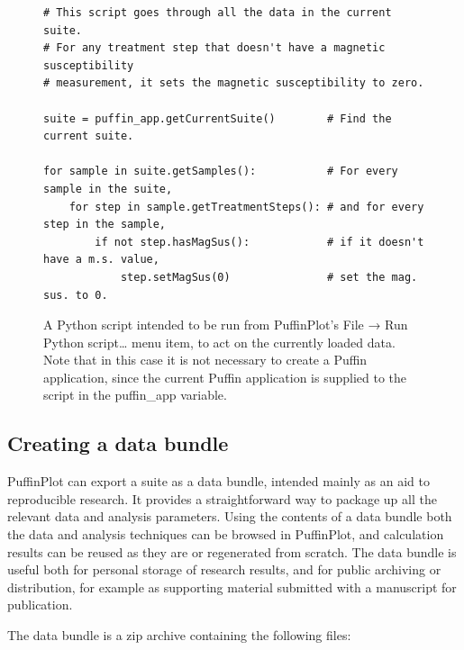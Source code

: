 \documentclass[a4paper,british]{article}
\newcommand{\ppcmd}[1]{\textsf{#1}} %
\newcommand{\submenu}{ \textrm{→} }
\begin{document}
\begin{figure}
  \caption{\label{fig:script-example-2} A Python script intended to be run
    from PuffinPlot's \ppcmd{File\submenu Run Python script\ldots} menu item,
    to act on the currently loaded data. Note that in this case it is not
    necessary to create a Puffin application, since the current Puffin
    application is supplied to the script in the \ppcmd{puffin\_app}
    variable. }
  \lstset{language=Python}
\begin{lstlisting}
# This script goes through all the data in the current suite.
# For any treatment step that doesn't have a magnetic susceptibility
# measurement, it sets the magnetic susceptibility to zero.

suite = puffin_app.getCurrentSuite()        # Find the current suite.

for sample in suite.getSamples():           # For every sample in the suite,
    for step in sample.getTreatmentSteps(): # and for every step in the sample,
        if not step.hasMagSus():            # if it doesn't have a m.s. value,
            step.setMagSus(0)               # set the mag. sus. to 0.
\end{lstlisting}
\end{figure}

\subsection{Creating a data bundle \label{sec:bundle}}

PuffinPlot can export a suite as a data bundle, intended mainly as an
aid to reproducible research. It provides a straightforward way to
package up all the relevant data and analysis parameters. Using the
contents of a data bundle both the data and analysis techniques can be
browsed in PuffinPlot, and calculation results can be reused as they are
or regenerated from scratch. The data bundle is useful both for personal
storage of research results, and for public archiving or distribution,
for example as supporting material submitted with a manuscript for
publication.

The data bundle is a zip archive containing the following files:
\end{document}
